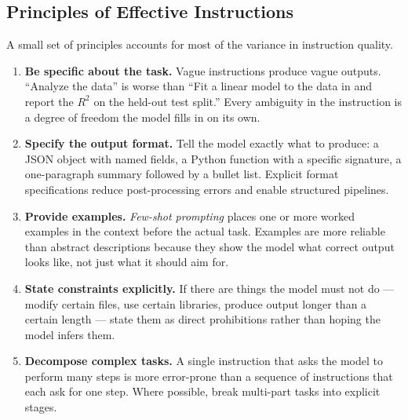 \subsection{Principles of Effective Instructions}

A small set of principles accounts for most of the variance in instruction quality.

\begin{enumerate}
\item \textbf{Be specific about the task.}
Vague instructions produce vague outputs.
``Analyze the data'' is worse than ``Fit a linear model to the data in  and report the $R^2$ on the held-out test split.''
Every ambiguity in the instruction is a degree of freedom the model fills in on its own.

\item \textbf{Specify the output format.}
Tell the model exactly what to produce: a JSON object with named fields, a Python function with a specific signature, a one-paragraph summary followed by a bullet list.
Explicit format specifications reduce post-processing errors and enable structured pipelines.

\item \textbf{Provide examples.}
\emph{Few-shot prompting} places one or more worked examples in the context before the actual task.
Examples are more reliable than abstract descriptions because they show the model what correct output looks like, not just what it should aim for.

\item \textbf{State constraints explicitly.}
If there are things the model must not do — modify certain files, use certain libraries, produce output longer than a certain length — state them as direct prohibitions rather than hoping the model infers them.

\item \textbf{Decompose complex tasks.}
A single instruction that asks the model to perform many steps is more error-prone than a sequence of instructions that each ask for one step.
Where possible, break multi-part tasks into explicit stages.
\end{enumerate}

